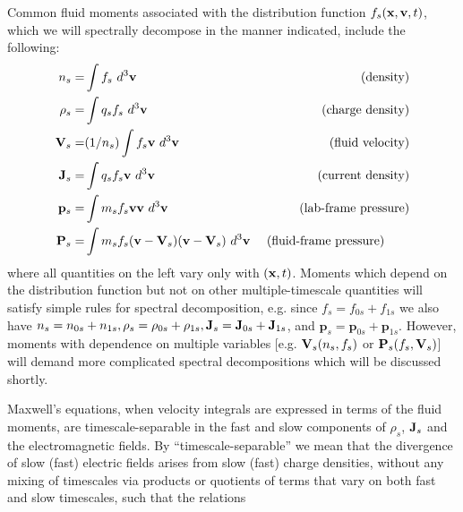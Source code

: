 Common fluid moments associated with the distribution function $f_{s}({\bf x},{\bf v},t)$,
which we will spectrally decompose in the manner indicated, include the following:
\begin{eqnarray}
n_{s} = & \int f_{s}~d^{3}{\bf v} & \mbox{~(density)} \label{densitymoment} \\
\rho_{s} = & \int q_{s} f_{s}~d^{3}{\bf v} & \mbox{~(charge density)} \\
{\bf V}_{s} = & (1/n_{s}) \int f_{s} {\bf v}~d^{3}{\bf v} & \mbox{~(fluid velocity)} \\
{\bf J}_{s} = & \int q_{s} f_{s} {\bf v}~d^{3}{\bf v} & \mbox{~(current density)} \\
{\mathbf p}_{s} = & \int m_{s} f_{s} {\bf v} {\bf v}~d^{3}{\bf v} & 
\mbox{~(lab-frame pressure)} \\
{\mathbf P}_{s} = & \int m_{s} f_{s} ({\bf v} - {\bf V}_{s})({\bf v} - {\bf V}_{s})~d^{3}{\bf v} & 
\mbox{~(fluid-frame pressure) ~~~~~} \label{ffpressuremoment} 
\end{eqnarray}
where all quantities on the left vary only with $({\bf x},t)$.  Moments which depend
on the distribution function but not on other multiple-timescale quantities will satisfy simple 
rules for spectral decomposition, e.g. since $f_{s} = f_{0s} + f_{1s}$ we also have $n_{s} = n_{0s} + n_{1s}, 
\rho_{s} = \rho_{0s} + \rho_{1s}, {\bf J}_{s} = {\bf J}_{0s} + {\bf J}_{1s}$, and  
${\mathbf p}_{s} = {\mathbf p}_{0s} + {\mathbf p}_{1s}$.  However, moments with dependence on
multiple variables [e.g. ${\bf V}_{s}(n_{s},f_{s})$ or ${\mathbf P}_{s}(f_{s},{\bf V}_{s})$]
will demand more complicated spectral decompositions which will be discussed shortly.

Maxwell's equations, when velocity integrals are expressed in terms of the fluid
moments, are timescale-separable in the fast and slow components of $\rho_{s}$, ${\bf J}_{s}$ and
the electromagnetic fields.  By ``timescale-separable'' we mean that 
the divergence of slow (fast) electric fields arises from slow (fast) charge 
densities, without any mixing of timescales via products or quotients of terms that vary on both fast and 
slow timescales, such that the relations

